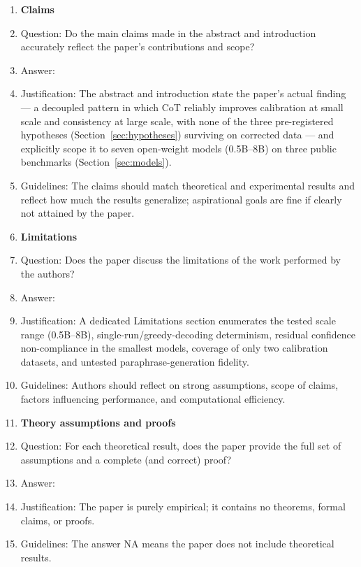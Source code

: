 \documentclass{article}
\begin{document}
\begin{enumerate}

\item {\bf Claims}
    \item[] Question: Do the main claims made in the abstract and introduction accurately reflect the paper's contributions and scope?
    \item[] Answer: \answerYes{}
    \item[] Justification: The abstract and introduction state the paper's actual finding --- a decoupled pattern in which CoT reliably improves calibration at small scale and consistency at large scale, with none of the three pre-registered hypotheses (Section~\ref{sec:hypotheses}) surviving on corrected data --- and explicitly scope it to seven open-weight models (0.5B--8B) on three public benchmarks (Section~\ref{sec:models}).
    \item[] Guidelines: The claims should match theoretical and experimental results and reflect how much the results generalize; aspirational goals are fine if clearly not attained by the paper.

\item {\bf Limitations}
    \item[] Question: Does the paper discuss the limitations of the work performed by the authors?
    \item[] Answer: \answerYes{}
    \item[] Justification: A dedicated Limitations section enumerates the tested scale range (0.5B--8B), single-run/greedy-decoding determinism, residual confidence non-compliance in the smallest models, coverage of only two calibration datasets, and untested paraphrase-generation fidelity.
    \item[] Guidelines: Authors should reflect on strong assumptions, scope of claims, factors influencing performance, and computational efficiency.

\item {\bf Theory assumptions and proofs}
    \item[] Question: For each theoretical result, does the paper provide the full set of assumptions and a complete (and correct) proof?
    \item[] Answer: \answerNA{}
    \item[] Justification: The paper is purely empirical; it contains no theorems, formal claims, or proofs.
    \item[] Guidelines: The answer NA means the paper does not include theoretical results.


\end{enumerate}
\end{document}
